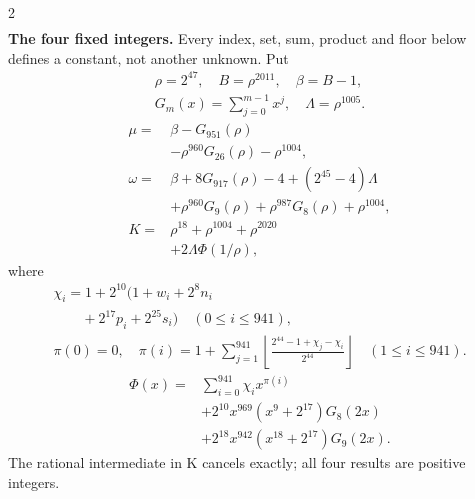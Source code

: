 \documentclass[10pt]{article}
\newcommand{\fl}[1]{\left\lfloor#1\right\rfloor}
\begin{document}
\begin{multicols}{2}
\[\begin{split}
\end{split}
\]
\textbf{The four fixed integers.}
Every index, set, sum, product and floor below defines a constant, not
another unknown. Put
\[
\begin{gathered}
\rho=2^{47},\quad B=\rho^{2011},\quad\beta=B-1,\\
G_m(x)=\sum_{j=0}^{m-1}x^j,\quad
\Lambda=\rho^{1005}.
\end{gathered}
\]
\begin{align*}
\mu={}&\beta-G_{951}(\rho)\\
&-\rho^{960}G_{26}(\rho)-\rho^{1004},\\
\omega={}&\beta+8G_{917}(\rho)-4+(2^{45}-4)\Lambda\\
&+\rho^{960}G_9(\rho)+\rho^{987}G_8(\rho)
  +\rho^{1004},\\
K={}&\rho^{18}+\rho^{1004}+\rho^{2020}\\
&+2\Lambda\Phi(1/\rho),
\end{align*}
where
\[
\begin{gathered}
\chi_i=1+2^{10}(1+w_i+2^8n_i\\
\qquad+2^{17}p_i+2^{25}s_i)\quad(0\le i\le941),\\
\pi(0)=0,\quad\pi(i)=1+\sum_{j=1}^{941}
\fl{\frac{2^{44}-1+\chi_j-\chi_i}{2^{44}}}\quad(1\le i\le941).
\end{gathered}
\]
\[
\begin{split}
\Phi(x)={}&\sum_{i=0}^{941}\chi_i x^{\pi(i)}\\
&+2^{10}x^{969}(x^9+2^{17})G_8(2x)\\
&+2^{18}x^{942}(x^{18}+2^{17})G_9(2x).
\end{split}
\]
The rational intermediate in K cancels exactly; all four results are positive integers.


\end{multicols}
\end{document}
